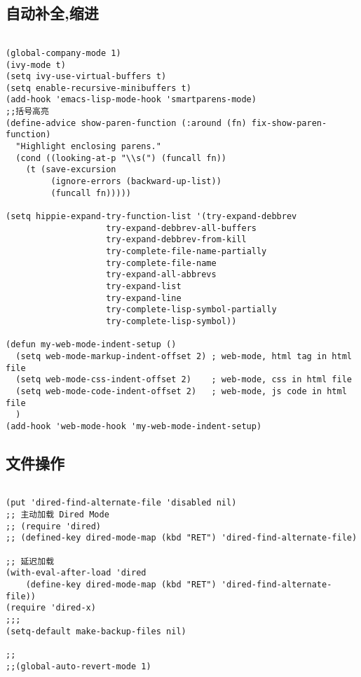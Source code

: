 \documentclass[11pt]{article}
\begin{document}
\subsection{自动补全,缩进}
\label{sec:org0d9b728}

\begin{verbatim}

(global-company-mode 1)
(ivy-mode t)
(setq ivy-use-virtual-buffers t)
(setq enable-recursive-minibuffers t)
(add-hook 'emacs-lisp-mode-hook 'smartparens-mode)
;;括号高亮
(define-advice show-paren-function (:around (fn) fix-show-paren-function)
  "Highlight enclosing parens."
  (cond ((looking-at-p "\\s(") (funcall fn))
	(t (save-excursion
	     (ignore-errors (backward-up-list))
	     (funcall fn)))))

(setq hippie-expand-try-function-list '(try-expand-debbrev
					try-expand-debbrev-all-buffers
					try-expand-debbrev-from-kill
					try-complete-file-name-partially
					try-complete-file-name
					try-expand-all-abbrevs
					try-expand-list
					try-expand-line
					try-complete-lisp-symbol-partially
					try-complete-lisp-symbol))

(defun my-web-mode-indent-setup ()
  (setq web-mode-markup-indent-offset 2) ; web-mode, html tag in html file
  (setq web-mode-css-indent-offset 2)    ; web-mode, css in html file
  (setq web-mode-code-indent-offset 2)   ; web-mode, js code in html file
  )
(add-hook 'web-mode-hook 'my-web-mode-indent-setup)

\end{verbatim}

\subsection{文件操作}
\label{sec:org202c58b}

\begin{verbatim}

(put 'dired-find-alternate-file 'disabled nil)
;; 主动加载 Dired Mode
;; (require 'dired)
;; (defined-key dired-mode-map (kbd "RET") 'dired-find-alternate-file)

;; 延迟加载
(with-eval-after-load 'dired
    (define-key dired-mode-map (kbd "RET") 'dired-find-alternate-file))
(require 'dired-x)
;;;
(setq-default make-backup-files nil)

;;
;;(global-auto-revert-mode 1)


\end{verbatim}
\end{document}
